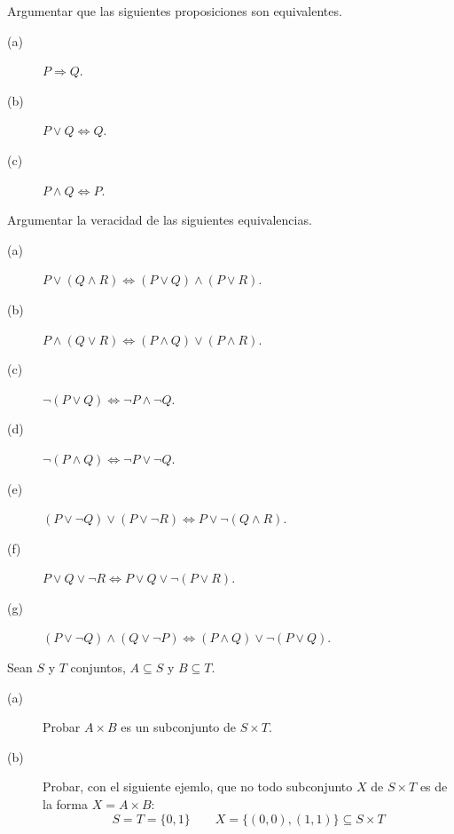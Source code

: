 \begin{ejercicio}
    Argumentar que las siguientes proposiciones son equivalentes.
    \begin{description}
        \item [(a)] $P \Longrightarrow Q$.
        \item [(b)] $P\lor Q \Longleftrightarrow Q$.
        \item [(c)] $P\land Q \Longleftrightarrow P$.
    \end{description}
\end{ejercicio}

\begin{ejercicio}
    Argumentar la veracidad de las siguientes equivalencias.
    \begin{description}
        \item [(a)] $P\lor(Q\land R) \Longleftrightarrow (P\lor Q)\land (P\lor R)$.
        \item [(b)] $P\land(Q\lor R) \Longleftrightarrow (P\land Q)\lor (P\land R)$.
        \item [(c)] $\neg(P\lor Q)\Longleftrightarrow \neg P \land \neg Q$.
        \item [(d)] $\neg(P\land Q)\Longleftrightarrow \neg P \lor \neg Q$.
        \item [(e)] $(P\lor \neg Q) \lor (P\lor \neg R) \Longleftrightarrow P\lor \neg (Q\land R)$.
        \item [(f)] $P\lor Q\lor \neg R \Longleftrightarrow P\lor Q\lor \neg (P\lor R)$.
        \item [(g)] $(P\lor \neg Q)\land(Q\lor \neg P)\Longleftrightarrow (P\land Q)\lor\neg(P\lor Q)$.
    \end{description}
\end{ejercicio}

\begin{ejercicio}
    Sean $S$ y $T$ conjuntos, $A\subseteq S$ y $B\subseteq T$.
    \begin{description}
        \item [(a)] Probar $A\times B$ es un subconjunto de $S\times T$.
        \item [(b)] Probar, con el siguiente ejemlo, que no todo subconjunto $X$ de $S\times T$ es de la forma $X=A\times B$:
            \begin{equation*}
                S = T = \{ 0,1 \} \qquad X = \{(0,0), (1,1)\} \subseteq S\times T
            \end{equation*}
    \end{description}
\end{ejercicio}

